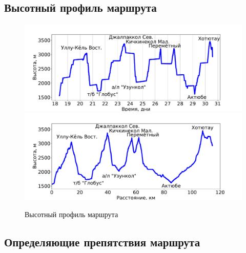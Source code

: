 \subsection{Высотный профиль маршрута}

\begin{figure}
	\centering
	\includegraphics[width=0.92\linewidth]{../pics/elevation_vs_time}
	\includegraphics[width=0.92\linewidth]{../pics/elevation_vs_distance}
	\caption{Высотный профиль маршрута}
	\label{fig:heights}
\end{figure}

\newpage
\subsection{Определяющие препятствия маршрута}

